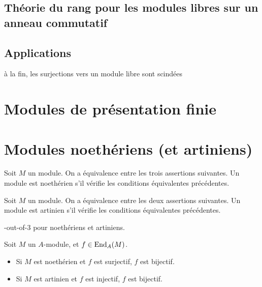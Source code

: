 \subsection{Théorie du rang pour les modules libres sur un anneau commutatif}
\subsection{Applications}

à la fin, les surjections vers un module libre sont scindées

\section{Modules de présentation finie}
\section{Modules noethériens (et artiniens)}

\begin{proposition} 
\end{proposition}

\begin{propdef} Soit $M$ un module. On a équivalence entre les trois assertions suivantes.
Un module est noethérien s'il vérifie les conditions équivalentes précédentes.
\end{propdef}


\begin{propdef} Soit $M$ un module. On a équivalence entre les deux assertions suivantes.
Un module est artinien s'il vérifie les conditions équivalentes précédentes.
\end{propdef}

\begin{proposition} -out-of-3\fg{} pour noethériens et artiniens.
\end{proposition}


\begin{proposition} Soit $M$ un $A$-module, et $f \in \operatorname{End}_A(M)$.
\begin{itemize}
\item Si $M$ est noethérien et $f$ est surjectif, $f$ est bijectif.
\item Si $M$ est artinien et $f$ est injectif, $f$ est bijectif.
\end{itemize}
\end{proposition}


